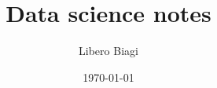 \documentclass[a4paper,10pt]{article}
\begin{document}
\title{Data science notes}
\author{Libero Biagi}

\date{\today}
\maketitle

\tableofcontents






%



%


\end{document}
